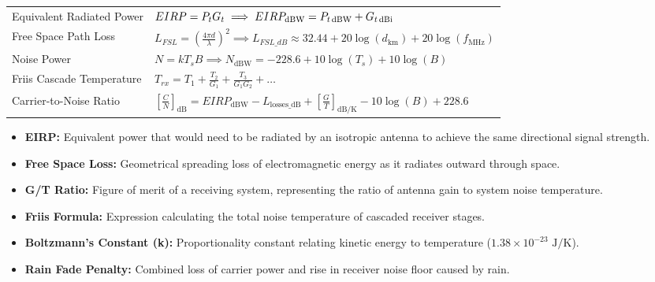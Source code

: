 \documentclass[12pt,a4paper]{article}
\renewcommand{\arraystretch}{1.45}
\begin{document}
\begin{tcolorbox}[formulabox, title={\textbf{Key Formulas at a Glance}}]
\renewcommand{\arraystretch}{1.9}
\begin{tabularx}{\linewidth}{B{5.0cm} X}Equivalent Radiated Power & $EIRP = P_t G_t \implies EIRP_{\text{dBW}} = P_{t\text{\,dBW}} + G_{t\text{\,dBi}}$ \\[4pt]
Free Space Path Loss & $\displaystyle L_{FSL} = \left(\frac{4\pi d}{\lambda}\right)^2 \implies L_{FSL\_dB} \approx 32.44 + 20\log(d_{\text{km}}) + 20\log(f_{\text{MHz}})$ \\[4pt]
Noise Power & $N = k T_s B \implies N_{\text{dBW}} = -228.6 + 10\log(T_s) + 10\log(B)$ \\[4pt]
Friis Cascade Temperature & $\displaystyle T_{rx} = T_1 + \frac{T_2}{G_1} + \frac{T_3}{G_1 G_2} + \dots$ \\[4pt]
Carrier-to-Noise Ratio & $\displaystyle \left[\frac{C}{N}\right]_{\text{dB}} = EIRP_{\text{dBW}} - L_{\text{losses\_dB}} + \left[\frac{G}{T}\right]_{\text{dB/K}} - 10\log(B) + 228.6$
\end{tabularx}
\end{tcolorbox}

\begin{tcolorbox}[defbox, title={\textbf{One-Line Definitions}}]
\begin{itemize}[leftmargin=*, itemsep=2.5pt, topsep=0pt]
  \item \textbf{EIRP:} Equivalent power that would need to be radiated by an isotropic antenna to achieve the same directional signal strength.
  \item \textbf{Free Space Loss:} Geometrical spreading loss of electromagnetic energy as it radiates outward through space.
  \item \textbf{G/T Ratio:} Figure of merit of a receiving system, representing the ratio of antenna gain to system noise temperature.
  \item \textbf{Friis Formula:} Expression calculating the total noise temperature of cascaded receiver stages.
  \item \textbf{Boltzmann's Constant (k):} Proportionality constant relating kinetic energy to temperature ($1.38 \times 10^{-23} \text{ J/K}$).
  \item \textbf{Rain Fade Penalty:} Combined loss of carrier power and rise in receiver noise floor caused by rain.
\end{itemize}
\end{tcolorbox}
\end{document}
